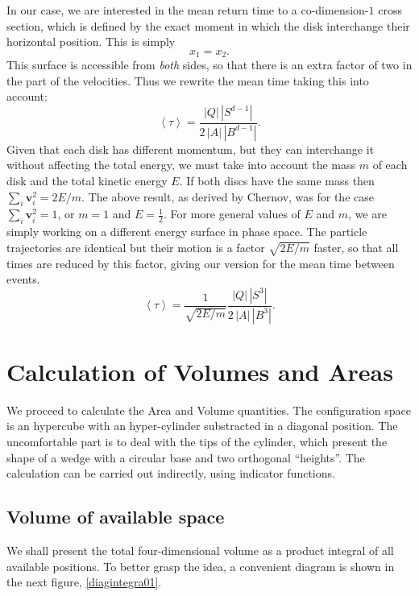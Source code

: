 \documentclass[a4paper,10pt]{article}
\newcommand{\mean}[1]{\left \langle #1 \right \rangle}
\newcommand{\vv}{\mathbf{v}}
\begin{document}
In our case, we are interested in the mean return time to a co-dimension-$1$ cross section, 
which is defined by the exact moment
in which the disk interchange their horizontal position. This is simply
\begin{equation} \label{condchoque}
x_1 = x_2.
\end{equation}
This surface is accessible from \emph{both} sides, 
so that there is an extra factor of two in the part of the velocities. Thus 
we rewrite the mean time taking this into account: 
\begin{equation}
 \mean{\tau} = \frac{|Q| \, |S^{d-1}|} {2 \, |A| \, |B^{d-1}|}.	
\end{equation}
Given that each disk has different momentum, but
they can interchange it without affecting the
total energy, we must take into account the mass $m$ of each disk and the total kinetic energy $E$.
If both discs have the same mass then $\sum_i \vv_i^2 = 2E / m$.
The above result, as derived by Chernov, was for the case $\sum_i \vv_i^2 = 1$, or $m=1$ and $E=\frac{1}{2}$.  
For more general values of $E$ and $m$, we are simply working on a different energy surface in phase space. 
The particle trajectories are identical but their motion is a factor
$\sqrt{2E/m}$ faster, so that all times are reduced by this factor, giving our version for
the mean time between events.
\begin{equation}
  \mean{\tau} = \frac{1}{\sqrt{2E / m}} 
\frac{|Q| \, |S^3|} {2 \, |A| \, |B^3|}.	
\end{equation}



\section{Calculation of Volumes and Areas}

We proceed to calculate the Area and Volume quantities.  The configuration
space is an hypercube with an hyper-cylinder substracted in a diagonal position.
The uncomfortable part is to deal with the tips of the cylinder, which
present the  shape of a wedge with a circular base and two 
orthogonal ``heights''. 
The calculation can be carried out indirectly, using indicator functions.


\subsection{Volume of available space}


We shall present the total four-dimensional volume as a product integral
of all available positions. To better grasp the idea, a convenient
diagram is shown in the next figure, \ref{diagintegra01}.
\end{document}
